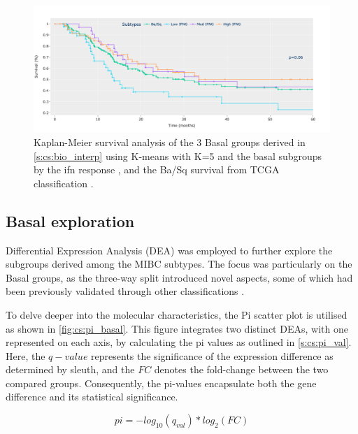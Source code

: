 \begin{figure}[!htb]    
    \centering
    \includegraphics[width=1.0\textwidth,keepaspectratio]{Sections/ClusteringAnalysis/Resources/discussion/survival_basal.png}
    \caption{Kaplan-Meier survival analysis of the 3 Basal groups derived in \cref{s:cs:bio_interp} using K-means with K=5 and the basal subgroups by the \acrshort{ifn} response \citet{Baker2022-bj}, and the Ba/Sq survival from TCGA classification \citet{Robertson2017-mg}.}
    \label{fig:cs:basal_survival}
\end{figure}

\subsection{Basal exploration} \label{s:cs:basal_interp}

Differential Expression Analysis (DEA) was employed to further explore the subgroups derived among the MIBC subtypes. The focus was particularly on the Basal groups, as the three-way split introduced novel aspects, some of which had been previously validated through other classifications \citet{Baker2022-bj,Marzouka2018-ge}.

To delve deeper into the molecular characteristics, the Pi scatter plot is utilised as shown in \cref{fig:cs:pi_basal}. This figure integrates two distinct DEAs, with one represented on each axis, by calculating the pi values as outlined in \cref{s:cs:pi_val}. Here, the $q-value$ represents the significance of the expression difference as determined by sleuth, and the $FC$ denotes the fold-change between the two compared groups. Consequently, the pi-values encapsulate both the gene difference and its statistical significance.


\begin{equation} \label{s:cs:pi_val}
    pi = - log_{10}(q_{val}) * log_{2}(FC)
\end{equation} 

